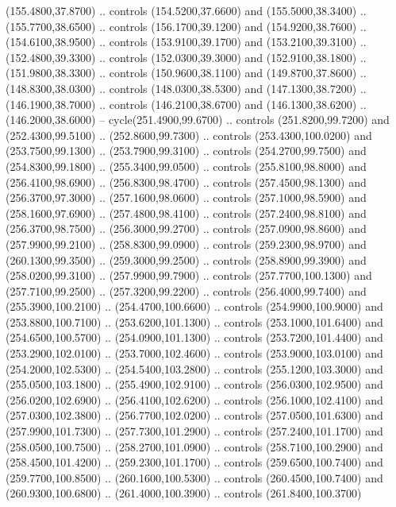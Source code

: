 {\begin{scope}[y=0.80pt, x=0.80pt, yscale=-1, xscale=1, inner sep=0pt, outer sep=0pt, #1]
      (155.4800,37.8700) .. controls (154.5200,37.6600) and (155.5000,38.3400) ..
      (155.7700,38.6500) .. controls (156.1700,39.1200) and (154.9200,38.7600) ..
      (154.6100,38.9500) .. controls (153.9100,39.1700) and (153.2100,39.3100) ..
      (152.4800,39.3300) .. controls (152.0300,39.3000) and (152.9100,38.1800) ..
      (151.9800,38.3300) .. controls (150.9600,38.1100) and (149.8700,37.8600) ..
      (148.8300,38.0300) .. controls (148.0300,38.5300) and (147.1300,38.7200) ..
      (146.1900,38.7000) .. controls (146.2100,38.6700) and (146.1300,38.6200) ..
      (146.2000,38.6000) -- cycle(251.4900,99.6700) .. controls (251.8200,99.7200)
      and (252.4300,99.5100) .. (252.8600,99.7300) .. controls (253.4300,100.0200)
      and (253.7500,99.1300) .. (253.7900,99.3100) .. controls (254.2700,99.7500)
      and (254.8300,99.1800) .. (255.3400,99.0500) .. controls (255.8100,98.8000)
      and (256.4100,98.6900) .. (256.8300,98.4700) .. controls (257.4500,98.1300)
      and (256.3700,97.3000) .. (257.1600,98.0600) .. controls (257.1000,98.5900)
      and (258.1600,97.6900) .. (257.4800,98.4100) .. controls (257.2400,98.8100)
      and (256.3700,98.7500) .. (256.3000,99.2700) .. controls (257.0900,98.8600)
      and (257.9900,99.2100) .. (258.8300,99.0900) .. controls (259.2300,98.9700)
      and (260.1300,99.3500) .. (259.3000,99.2500) .. controls (258.8900,99.3900)
      and (258.0200,99.3100) .. (257.9900,99.7900) .. controls (257.7700,100.1300)
      and (257.7100,99.2500) .. (257.3200,99.2200) .. controls (256.4000,99.7400)
      and (255.3900,100.2100) .. (254.4700,100.6600) .. controls (254.9900,100.9000)
      and (253.8800,100.7100) .. (253.6200,101.1300) .. controls (253.1000,101.6400)
      and (254.6500,100.5700) .. (254.0900,101.1300) .. controls (253.7200,101.4400)
      and (253.2900,102.0100) .. (253.7000,102.4600) .. controls (253.9000,103.0100)
      and (254.2000,102.5300) .. (254.5400,103.2800) .. controls (255.1200,103.3000)
      and (255.0500,103.1800) .. (255.4900,102.9100) .. controls (256.0300,102.9500)
      and (256.0200,102.6900) .. (256.4100,102.6200) .. controls (256.1000,102.4100)
      and (257.0300,102.3800) .. (256.7700,102.0200) .. controls (257.0500,101.6300)
      and (257.9900,101.7300) .. (257.7300,101.2900) .. controls (257.2400,101.1700)
      and (258.0500,100.7500) .. (258.2700,101.0900) .. controls (258.7100,100.2900)
      and (258.4500,101.4200) .. (259.2300,101.1700) .. controls (259.6500,100.7400)
      and (259.7700,100.8500) .. (260.1600,100.5300) .. controls (260.4500,100.7400)
      and (260.9300,100.6800) .. (261.4000,100.3900) .. controls (261.8400,100.3700)

\end{scope}}
